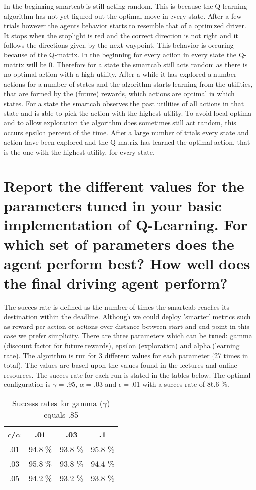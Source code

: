 \documentclass{article}
\begin{document}
In the beginning smartcab is still acting random. This is because the Q-learning algorithm has not yet figured out the optimal move in every state. After a few trials however the agents behavior starts to resemble that of a optimized driver. It stops when the stoplight is red and the correct direction is not right and it follows the directions given by the next waypoint. This behavior is occuring because of the Q-matrix. In the beginning for every action in every state the Q-matrix will be 0. Therefore for a state the smartcab still acts random as there is no optimal action with a high utility. After a while it has explored a number actions for a number of states and the algorithm starts learning from the utilities, that are formed by the (future) rewards, which actions are optimal in which states. For a state the smartcab observes the past utilities of all actions in that state and is able to pick the action with the highest utility. To avoid local optima and to allow exploration the algorithm does sometimes still act random, this occurs epsilon percent of the time. After a large number of trials every state and action have been explored and the Q-matrix has learned the optimal action, that is the one with the highest utility, for every state.

\section*{Report the different values for the parameters tuned in your basic implementation of Q-Learning. For which set of parameters does the agent perform best? How well does the final driving agent perform?}

The succes rate is defined as the number of times the smartcab reaches its destination within the deadline. Although we could deploy 'smarter' metrics such as reward-per-action or actions over distance between start and end point in this case we prefer simplicity. There are three parameters which can be tuned: gamma (discount factor for future rewards), epsilon (exploration) and alpha (learning rate). The algorithm is run for 3 different values for each parameter (27 times in total). The values are based upon the values found in the lectures and online resources. The succes rate for each run is stated in the tables below. The optimal configuration is $\gamma$ = .95, $\alpha$ = .03 and $\epsilon$ = .01 with a succes rate of 86.6 \%.

\begin{table}
\centering
\begin{tabular}{c | c | c | c |}
\hline
$\epsilon$/$\alpha$ & .01 & .03 & .1 \\ \hline
.01 & 94.8 \% & 93.8 \% & 95.8 \% \\ \hline
.03 & 95.8 \% & 93.8 \% & 94.4 \% \\ \hline
.05 & 94.2 \%  & 93.2 \% & 93.8 \% \\ \hline
\end{tabular}
\caption{Success rates for gamma ($\gamma$) equals .85}
\end{table}
\end{document}
